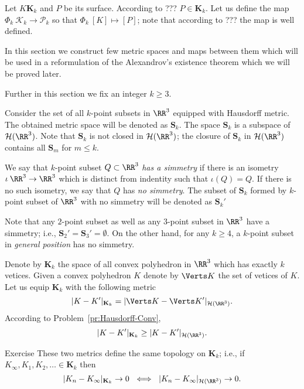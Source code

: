 Let $K\mathbf{K}_k$ and $P$ be its surface.
According to ??? $P\in \mathbf{K}_k$.
Let us define the map $\Phi_k\:\mathcal{K}_k\to \mathcal{P}_k$
so that $\Phi_k\:[K]\mapsto [P]$;
note that according to ??? the map is well defined.





In this section we construct few metric spaces and maps between them which will be used in a reformulation of the Alexandrov's existence theorem which we will be proved later.

Further in this section we fix an integer $k\ge 3$.

Consider the set of all $k$-point subsets in $\RR^3$ equipped with Hausdorff metric.
The obtained metric space will be denoted as $\mathbf{S}_k$.
The space $\mathbf{S}_k$ is a subspace of $\mathcal{H}(\RR^3)$.
Note that $\mathbf{S}_k$ is not closed in $\mathcal{H}(\RR^3)$;
the closure of $\mathbf{S}_k$ in $\mathcal{H}(\RR^3)$ contains all $\mathbf{S}_m$ for $m\le k$.

We say that $k$-point subset $Q\subset \RR^3$ \emph{has a simmetry} if there is an isometry $\iota\:\RR^3\to\RR^3$ which is distinct from indentity
such that $\iota(Q)=Q$.
If there is no such isometry, we say that  $Q$ has \emph{no simmetry}.
The subset of $\mathbf{S}_k$ formed by $k$-point subset of $\RR^3$ with no simmetry will be denoted as $\mathbf{S}_k'$

Note that any $2$-point subset as well as any $3$-point subset in $\RR^3$ have a simmetry;
i.e., $\mathbf{S}_2'=\mathbf{S}_3'=\emptyset$.
On the other hand, for any $k\ge 4$,
a $k$-point subset in \emph{general position} has no simmetry.

Denote by $\mathbf{K}_k$ the space of all convex polyhedron in $\RR^3$ which has exactly $k$ vetices.
Given a convex polyhedron $K$ denote by $\Verts K$ the set of vetices of $K$.
Let us equip $\mathbf{K}_k$ with the following metric
$$|K-K'|_{\mathbf{K}_k}=|\Verts K-\Verts K'|_{\mathcal{H}(\RR^3)}.$$
According to Problem~\ref{pr:Hausdorff-Conv},
$$|K-K'|_{\mathbf{K}_k}\ge |K-K'|_{\mathcal{H}(\RR^3)}.$$

\begin{thm}{Exercise}
These two metrics define the same topology on $\mathbf{K}_k$;
i.e., if $K_\infty, K_1,K_2,\dots\in \mathbf{K}_k$ then
$$|K_n-K_\infty|_{\mathbf{K}_k}\to 0\ \iff \ |K_n-K_\infty|_{\mathcal{H}(\RR^3)}\to 0.$$

\end{thm}



